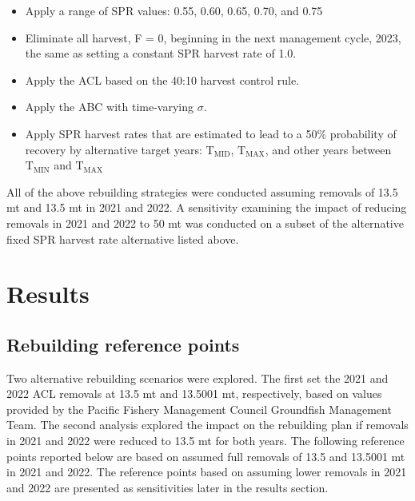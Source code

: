 \documentclass[11pt,
  english,
  a4paper,
]{article}
\begin{document}
\leavevmode\tagmcend\tagstructend\par

\begin{itemize}
    \item Apply a range of SPR values: 0.55, 0.60, 0.65, 0.70, and 0.75 
    \item Eliminate all harvest, F = 0, beginning in the next management cycle, 2023, the same as setting a constant SPR harvest rate of 1.0.
    \item Apply the ACL based on the 40:10 harvest control rule.
    \item Apply the ABC with time-varying $\sigma$.
    \item Apply SPR harvest rates that are estimated to lead to a 50$\%$ probability of recovery by alternative target years: $\text{T}_\text{MID}$, $\text{T}_\text{MAX}$, and other years between $\text{T}_\text{MIN}$ and $\text{T}_\text{MAX}$
\end{itemize}


All of the above rebuilding strategies were conducted assuming removals of 13.5 mt and 13.5 mt in 2021 and 2022. A sensitivity examining the impact of reducing removals in 2021 and 2022 to 50 mt was conducted on a subset of the alternative fixed SPR harvest rate alternative listed above.

\leavevmode\tagmcend\tagstructend\par


\hypertarget{results}{%
\section{Results}\label{results}}

\leavevmode\tagmcend\tagstructend


\hypertarget{rebuilding-reference-points}{%
\subsection{Rebuilding reference points}\label{rebuilding-reference-points}}

\leavevmode\tagmcend\tagstructend


Two alternative rebuilding scenarios were explored. The first set the 2021 and 2022 ACL removals at 13.5 mt and 13.5001 mt, respectively, based on values provided by the Pacific Fishery Management Council Groundfish Management Team. The second analysis explored the impact on the rebuilding plan if removals in 2021 and 2022 were reduced to 13.5 mt for both years. The following reference points reported below are based on assumed full removals of 13.5 and 13.5001 mt in 2021 and 2022. The reference points based on assuming lower removals in 2021 and 2022 are presented as sensitivities later in the results section.
\end{document}
